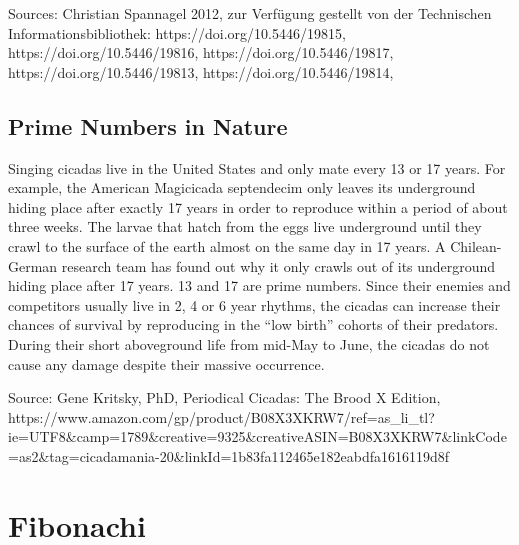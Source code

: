 \documentclass[11pt]{article}
\begin{document}
Sources: Christian Spannagel 2012, zur Verfügung gestellt von der
Technischen Informationsbibliothek: https://doi.org/10.5446/19815,
https://doi.org/10.5446/19816, https://doi.org/10.5446/19817,
https://doi.org/10.5446/19813, https://doi.org/10.5446/19814,

    \hypertarget{prime-numbers-in-nature}{%
\subsection{Prime Numbers in Nature}\label{prime-numbers-in-nature}}

Singing cicadas live in the United States and only mate every 13 or 17
years. For example, the American Magicicada septendecim only leaves its
underground hiding place after exactly 17 years in order to reproduce
within a period of about three weeks. The larvae that hatch from the
eggs live underground until they crawl to the surface of the earth
almost on the same day in 17 years. A Chilean-German research team has
found out why it only crawls out of its underground hiding place after
17 years. 13 and 17 are prime numbers. Since their enemies and
competitors usually live in 2, 4 or 6 year rhythms, the cicadas can
increase their chances of survival by reproducing in the ``low birth''
cohorts of their predators. During their short aboveground life from
mid-May to June, the cicadas do not cause any damage despite their
massive occurrence.

Source: Gene Kritsky, PhD, Periodical Cicadas: The Brood X Edition,
https://www.amazon.com/gp/product/B08X3XKRW7/ref=as\_li\_tl?ie=UTF8\&camp=1789\&creative=9325\&creativeASIN=B08X3XKRW7\&linkCode=as2\&tag=cicadamania-20\&linkId=1b83fa112465e182eabdfa1616119d8f

    \hypertarget{fibonachi}{%
\section{Fibonachi}\label{fibonachi}}
\end{document}
